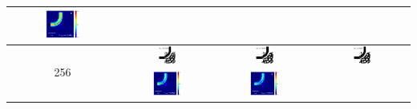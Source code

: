 \begin{table}[ht]
\begin{tabular}{|c|c|c|c|}
      \includegraphics[width=0.33\textwidth]{image/results/bend/GA/visualize_field_fab_128.png} \\
    \hline
      \multirow{2}{*}{256} &
      \includegraphics[width=0.20\textwidth]{image/results/bend/GA/visualize_eps_cont_256.png} &
      \includegraphics[width=0.20\textwidth]{image/results/bend/GA/visualize_eps_disc_256.png} &
      \includegraphics[width=0.20\textwidth]{image/results/bend/GA/visualize_eps_fab_256.png} \\
      \cline{2-4}
      &
      \includegraphics[width=0.33\textwidth]{image/results/bend/GA/visualize_field_cont_256.png} &
      \includegraphics[width=0.33\textwidth]{image/results/bend/GA/visualize_field_disc_256.png} &

\end{tabular}
\end{table}
